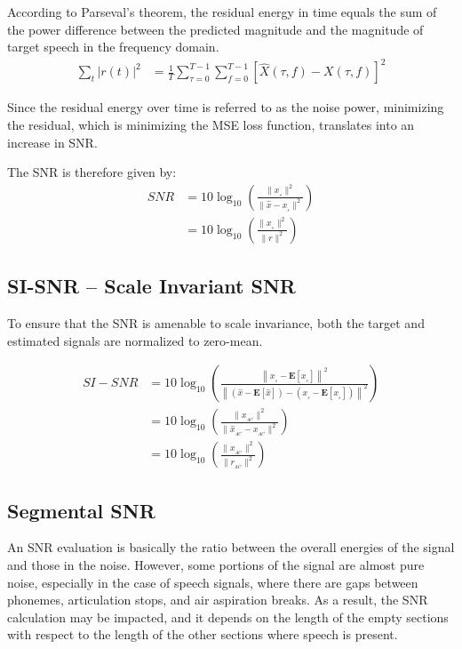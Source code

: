 According to Parseval's theorem, the residual energy in time equals the sum of
the power difference between the predicted magnitude 
and the magnitude of target speech 
in the frequency domain\cite{1643671009}.
\begin{align}
    \sum_{t} |r(t)|^{2} & = \frac{1}{T}\sum_{\tau=0}^{T-1}\sum_{f=0}^{T-1} \left[ \widehat{X}(\tau, f) - X(\tau, f)\right]^{2}
\end{align}

Since the residual energy over time is referred to as the noise power,
minimizing the residual,
which is minimizing the MSE loss function,
translates into an increase in SNR.



The SNR is therefore given by:
\begin{align}\label{eq:snr_equation}
    SNR & = 10\log_{10} \left( \frac{ \| x_{_{s}}\|^{2}}{\|\widehat{x} - x_{_{s}} \|^{2}}  \right) \nonumber \\
    & =  10\log_{10} \left( \frac{ \| x_{_{s}} \|^{2}}{\| r \|^{2}} \right)
\end{align}
\subsection{SI-SNR -- Scale Invariant SNR}
To ensure that the SNR is amenable to scale invariance\cite{roux2018sdr},
both the target and estimated signals are normalized to zero-mean.

\begin{align}
    SI-SNR & = 10\log_{10} \left( \frac{\left\| x_{_{s}} - \mathbf{E}[x_{_{s}}]\right\|^{2}}
    {\left\| (\widehat{x} - \mathbf{E}[\widehat{x}]) - (x_{_{s}} - \mathbf{E}[x_{_{s}}]) \right\|^{2}} \right) \nonumber \\
    & = 10\log_{10} \left( \frac{ \| x_{_{AC}}\|^{2}}{\|\widehat{x}_{_{AC}} - x_{_{AC}}\|^{2}}  \right) \nonumber \\
    & =  10\log_{10} \left( \frac{ \| x_{_{AC}}\|^{2}}{\| r_{_{AC}} \|^{2}} \right)
\end{align}

\subsection{Segmental SNR}
An SNR evaluation is basically the ratio between the overall 
energies of the signal and those in the noise. 
However, some portions of the signal are almost pure noise, 
especially in the case of speech signals, 
where there are gaps between phonemes, 
articulation stops, and air aspiration breaks. As a result,
the SNR calculation may be impacted, and
it depends on
the length of the empty sections with respect 
to the length of
the other sections where speech is present.

